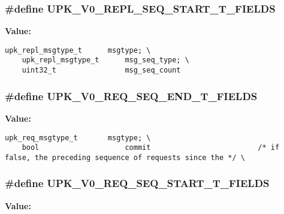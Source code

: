 \subsubsection{\setlength{\rightskip}{0pt plus 5cm}\#define UPK\_\-V0\_\-REPL\_\-SEQ\_\-START\_\-T\_\-FIELDS}\label{upk__v0__protocol__structs_8h_ae80d18fe9013c586a7a4ec9287156ab}


\textbf{Value:}

\begin{Code}\begin{verbatim}upk_repl_msgtype_t      msgtype; \
    upk_repl_msgtype_t      msg_seq_type; \
    uint32_t                msg_seq_count
\end{verbatim}\end{Code}
\subsubsection{\setlength{\rightskip}{0pt plus 5cm}\#define UPK\_\-V0\_\-REQ\_\-SEQ\_\-END\_\-T\_\-FIELDS}\label{upk__v0__protocol__structs_8h_01c61567c7f6c55448885ce68f21e0be}


\textbf{Value:}

\begin{Code}\begin{verbatim}upk_req_msgtype_t       msgtype; \
    bool                    commit                         /* if false, the preceding sequence of requests since the */ \
\end{verbatim}\end{Code}
\subsubsection{\setlength{\rightskip}{0pt plus 5cm}\#define UPK\_\-V0\_\-REQ\_\-SEQ\_\-START\_\-T\_\-FIELDS}\label{upk__v0__protocol__structs_8h_e2b31702f8ddd5309413fe2e78807aa7}


\textbf{Value:}

